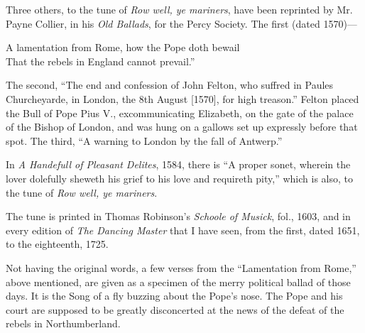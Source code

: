 Three others, to the tune of \textit{Row well, ye mariners}, have been reprinted by
Mr. Payne Collier, in his \textit{Old Ballads}, for the Percy Society. The first (dated
1570)—
\settowidth{\versewidth}{A lamentation from Rome, how the Pope doth bewail}
\begin{scverse}
A lamentation from Rome, how the Pope doth bewail\\
That the rebels in England cannot prevail.”
\end{scverse}
The second, “The end and confession of John Felton, who suffred in Paules
Churcheyarde, in London, the 8th August [1570], for high treason.” Felton
placed the Bull of Pope Pius V., excommunicating Elizabeth, on the gate of the
palace of the Bishop of London, and was hung on a gallows set up expressly
before that spot. The third, “A warning to London by the fall of Antwerp.”

In \textit{A Handefull of Pleasant Delites}, 1584, there is “A proper sonet, wherein
the lover dolefully sheweth his grief to his love and requireth pity,” which is
also, to the tune of \textit{Row well, ye mariners}.

The tune is printed in Thomas Robinson’s \textit{Schoole of Musick}, fol., 1603, and
in every edition of \textit{The Dancing Master} that I have seen, from the first, dated
1651, to the eighteenth, 1725.

Not having the original words, a few verses from the “Lamentation from
Rome,” above mentioned, are given as a specimen of the merry political ballad of
those days. It is the Song of a fly buzzing about the Pope’s nose. The Pope and
his court are supposed to be greatly disconcerted at the news of the defeat of the
rebels in Northumberland.

\noindent\begin{minipage}{\textwidth}

\end{minipage}


\pagebreak

